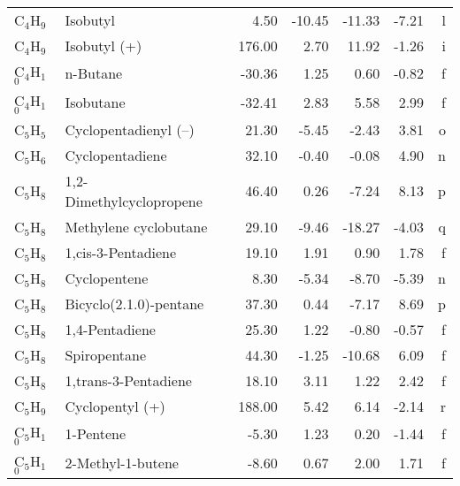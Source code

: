 \begin{table}
\begin{center}
\begin{tabular}{llrrrrr}
 C$_4$H$_9$        & Isobutyl                       &     4.50    &   -10.45  &   -11.33  &    -7.21  &      l\\
 C$_4$H$_9$        & Isobutyl (+)                   &   176.00    &     2.70  &    11.92  &    -1.26  &      i\\
 C$_4$H$_1$$_0$       & n-Butane                       &   -30.36    &     1.25  &     0.60  &    -0.82  &      f\\
 C$_4$H$_1$$_0$       & Isobutane                      &   -32.41    &     2.83  &     5.58  &     2.99  &      f\\
 C$_5$H$_5$        & Cyclopentadienyl (--)            &    21.30    &    -5.45 &    -2.43  &     3.81  &      o\\
 C$_5$H$_6$        & Cyclopentadiene                 &    32.10    &    -0.40 &    -0.08  &     4.90  &      n\\
 C$_5$H$_8$        & 1,2-Dimethylcyclopropene        &    46.40    &     0.26  &    -7.24  &     8.13  &      p\\
 C$_5$H$_8$        & Methylene cyclobutane           &    29.10    &    -9.46  &   -18.27  &    -4.03  &      q\\
 C$_5$H$_8$        & 1,cis-3-Pentadiene              &    19.10    &     1.91  &     0.90  &     1.78  &      f\\
 C$_5$H$_8$        & Cyclopentene                    &     8.30    &    -5.34  &    -8.70  &    -5.39  &      n\\
 C$_5$H$_8$        & Bicyclo(2.1.0)-pentane          &    37.30    &     0.44  &    -7.17  &     8.69  &      p\\
 C$_5$H$_8$        & 1,4-Pentadiene                  &    25.30    &     1.22  &    -0.80  &    -0.57  &      f\\
 C$_5$H$_8$        & Spiropentane                    &    44.30    &    -1.25  &   -10.68  &     6.09  &      f\\
 C$_5$H$_8$        & 1,trans-3-Pentadiene            &    18.10    &     3.11  &     1.22  &     2.42  &      f\\
 C$_5$H$_9$        & Cyclopentyl (+)                 &   188.00    &     5.42  &     6.14  &    -2.14  &      r\\
 C$_5$H$_1$$_0$       & 1-Pentene                       &    -5.30    &     1.23  &     0.20  &    -1.44  &      f\\
 C$_5$H$_1$$_0$       & 2-Methyl-1-butene               &    -8.60    &     0.67  &     2.00  &     1.71  &      f\\

\end{tabular}
\end{center}
\end{table}
